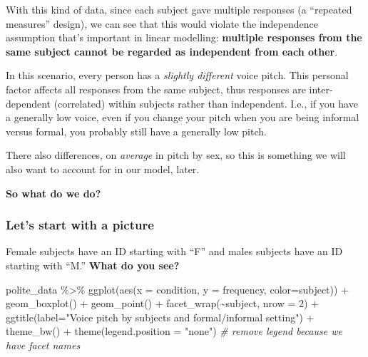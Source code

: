 \documentclass[
  openany]{book}
\newenvironment{Shaded}{\begin{snugshade}}{\end{snugshade}}
\newcommand{\AttributeTok}[1]{\textcolor[rgb]{0.77,0.63,0.00}{#1}}
\newcommand{\CommentTok}[1]{\textcolor[rgb]{0.56,0.35,0.01}{\textit{#1}}}
\newcommand{\DecValTok}[1]{\textcolor[rgb]{0.00,0.00,0.81}{#1}}
\newcommand{\FunctionTok}[1]{\textcolor[rgb]{0.00,0.00,0.00}{#1}}
\newcommand{\NormalTok}[1]{#1}
\newcommand{\SpecialCharTok}[1]{\textcolor[rgb]{0.00,0.00,0.00}{#1}}
\newcommand{\StringTok}[1]{\textcolor[rgb]{0.31,0.60,0.02}{#1}}
\begin{document}
With this kind of data, since each subject gave multiple responses (a ``repeated measures'' design), we can see that this would violate the independence assumption that's important in linear modelling: \textbf{multiple responses from the same subject cannot be regarded as independent from each other}.

In this scenario, every person has a \emph{slightly different} voice pitch. This personal factor affects all responses from the same subject, thus responses are inter-dependent (correlated) within subjects rather than independent. I.e., if you have a generally low voice, even if you change your pitch when you are being informal versus formal, you probably still have a generally low pitch.

There also differences, on \emph{average} in pitch by sex, so this is something we will also want to account for in our model, later.

\textbf{So what do we do?}

\hypertarget{lets-start-with-a-picture}{%
\subsubsection{Let's start with a picture}\label{lets-start-with-a-picture}}

Female subjects have an ID starting with ``F'' and males subjects have an ID starting with ``M.'' \textbf{What do you see?}

\begin{Shaded}
\begin{Highlighting}[]
\NormalTok{polite\_data }\SpecialCharTok{\%\textgreater{}\%} 
  \FunctionTok{ggplot}\NormalTok{(}\FunctionTok{aes}\NormalTok{(}\AttributeTok{x =}\NormalTok{ condition, }
             \AttributeTok{y =}\NormalTok{ frequency,}
             \AttributeTok{color=}\NormalTok{subject)) }\SpecialCharTok{+}
  \FunctionTok{geom\_boxplot}\NormalTok{() }\SpecialCharTok{+} 
  \FunctionTok{geom\_point}\NormalTok{() }\SpecialCharTok{+}
  \FunctionTok{facet\_wrap}\NormalTok{(}\SpecialCharTok{\textasciitilde{}}\NormalTok{subject, }\AttributeTok{nrow =} \DecValTok{2}\NormalTok{) }\SpecialCharTok{+}
  \FunctionTok{ggtitle}\NormalTok{(}\AttributeTok{label=}\StringTok{"Voice pitch by subjects and formal/informal setting"}\NormalTok{) }\SpecialCharTok{+}
  \FunctionTok{theme\_bw}\NormalTok{() }\SpecialCharTok{+}
  \FunctionTok{theme}\NormalTok{(}\AttributeTok{legend.position =} \StringTok{"none"}\NormalTok{) }\CommentTok{\# remove legend because we have facet names}
\end{Highlighting}
\end{Shaded}
\end{document}

